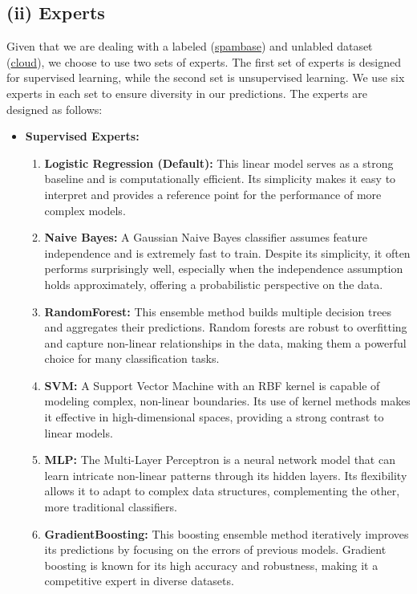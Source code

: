 \documentclass{article}
\begin{document}
\subsection*{(ii) Experts}
Given that we are dealing with a labeled (\href{https://archive.ics.uci.edu/ml/datasets/spambase}{spambase}) and unlabled dataset (\href{https://archive.ics.uci.edu/ml/datasets/Cloud}{cloud}), we choose to use two sets of experts. The first set of experts is designed for supervised learning, while the second set is unsupervised learning. We use six experts in each set to ensure diversity in our predictions. The experts are designed as follows:
\newpage
\begin{itemize}
  \item \textbf{Supervised Experts:}
  \begin{enumerate}
      \item \textbf{Logistic Regression (Default):} This linear model serves as a strong baseline and is computationally efficient. Its simplicity makes it easy to interpret and provides a reference point for the performance of more complex models.
      \item \textbf{Naive Bayes:} A Gaussian Naive Bayes classifier assumes feature independence and is extremely fast to train. Despite its simplicity, it often performs surprisingly well, especially when the independence assumption holds approximately, offering a probabilistic perspective on the data.
      \item \textbf{RandomForest:} This ensemble method builds multiple decision trees and aggregates their predictions. Random forests are robust to overfitting and capture non-linear relationships in the data, making them a powerful choice for many classification tasks.
      \item \textbf{SVM:} A Support Vector Machine with an RBF kernel is capable of modeling complex, non-linear boundaries. Its use of kernel methods makes it effective in high-dimensional spaces, providing a strong contrast to linear models.
      \item \textbf{MLP:} The Multi-Layer Perceptron is a neural network model that can learn intricate non-linear patterns through its hidden layers. Its flexibility allows it to adapt to complex data structures, complementing the other, more traditional classifiers.
      \item \textbf{GradientBoosting:} This boosting ensemble method iteratively improves its predictions by focusing on the errors of previous models. Gradient boosting is known for its high accuracy and robustness, making it a competitive expert in diverse datasets.
  \end{enumerate}
  

\end{itemize}
\end{document}
